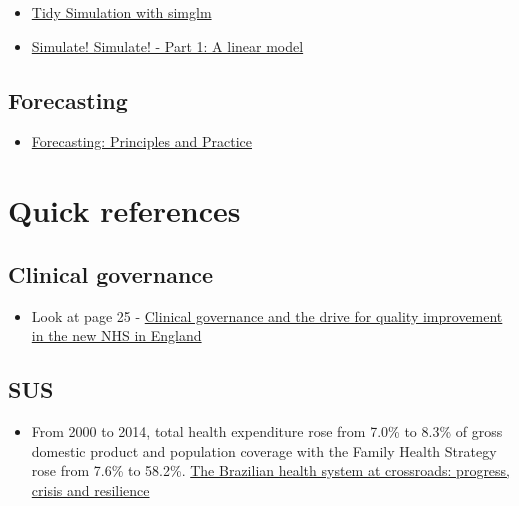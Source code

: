 \documentclass[]{book}
\providecommand{\tightlist}{%
  \setlength{\itemsep}{0pt}\setlength{\parskip}{0pt}}
\begin{document}
\begin{itemize}
\item
  \href{https://cran.r-project.org/web/packages/simglm/vignettes/tidy_simulation.html}{Tidy Simulation with simglm}
\item
  \href{https://aosmith.rbind.io/2018/01/09/simulate-simulate-part1/}{Simulate! Simulate! - Part 1: A linear model}
\end{itemize}

\hypertarget{forecasting}{%
\section*{Forecasting}\label{forecasting}}

\begin{itemize}
\tightlist
\item
  \href{https://otexts.com/fpp2/}{Forecasting: Principles and Practice}
\end{itemize}

\hypertarget{quick-references}{%
\chapter*{Quick references}\label{quick-references}}

\hypertarget{clinical-governance}{%
\section*{Clinical governance}\label{clinical-governance}}

\begin{itemize}
\tightlist
\item
  Look at page 25 - \href{https://www.ncbi.nlm.nih.gov/pmc/articles/PMC1113460/pdf/61.pdf}{Clinical governance and the drive for quality improvement in the new NHS in England}
\end{itemize}

\hypertarget{sus}{%
\section*{SUS}\label{sus}}

\begin{itemize}
\tightlist
\item
  From 2000 to 2014, total health expenditure rose from 7.0\% to 8.3\% of gross domestic product and population coverage with the Family Health Strategy rose from 7.6\% to 58.2\%. \href{https://www.ncbi.nlm.nih.gov/pmc/articles/PMC6035510/pdf/bmjgh-2018-000829.pdf}{The Brazilian health system at crossroads: progress, crisis and resilience}
\end{itemize}
\end{document}
